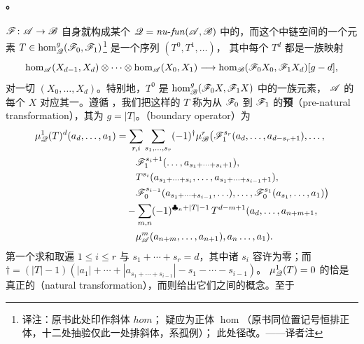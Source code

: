 \paragraph{\trNaturalTransformation。}\label{sub:natural-transformations}
\trNonunital{} \trAFunctor{} $\mathscr{F}\colon\mathscr{A}\to\mathscr{B}$ 自身就构成某个\trNonunital{}
\trACategory{} $\mathscr{Q}=\mathit{nu}\text{-}\mathit{fun}(\mathscr{A},\mathscr{B})$
中的\trObject{}，而这个\trCategory{}中\trMorphism{}链空间的一个元素
$T\in\hom^{g}_{\mathscr{Q}}(\mathscr{F}_0,\mathscr{F}_1)$\footnote{译注：原书此处印作斜体 $hom$；
疑应为正体 $\hom$（原书同位置记号恒排正体，十二处抽验仅此一处排斜体，系孤例）；
此处径改。——译者注} 是一个序列 $(T^0,T^1,\ldots)$，
其中每个 $T^d$ 都是一族\trMultilinear{}映射
\begin{equation*}
\hom_{\mathscr{A}}(X_{d-1},X_d)\otimes\cdots\otimes\hom_{\mathscr{A}}(X_0,X_1)
  \longrightarrow\hom_{\mathscr{B}}(\mathscr{F}_0X_0,\mathscr{F}_1X_d)[g-d],
\end{equation*}
对一切 $(X_0,\ldots,X_d)$。特别地，$T^0$ 是
$\hom^{g}_{\mathscr{B}}(\mathscr{F}_0X,\mathscr{F}_1X)$ 中的一族元素，
$\mathscr{A}$ 的每个\trObject{} $X$ 对应其一。遵循 \trFukaya，我们把这样的 $T$ 称为从
$\mathscr{F}_0$ 到 $\mathscr{F}_1$ 的\textbf{预\trNaturalTransformation}（pre-natural
transformation），其\trDegree{}为 $g=|T|$。\textbf{\trBoundaryOperator}（boundary
operator）为
\begin{equation}\label{eq:natural-transformation-boundary}
\begin{split}
\mu^1_{\mathscr{Q}}(T)^d(a_d,\ldots,a_1)
&=\sum_{r,i}\sum_{s_1,\ldots,s_r}(-1)^{\dagger}\mu^r_{\mathscr{B}}\bigl(
  \mathscr{F}_1^{s_r}(a_d,\ldots,a_{d-s_r+1}),\ldots,\\
&\qquad \mathscr{F}_1^{s_i+1}(\ldots,a_{s_1+\cdots+s_i+1}),\\
&\qquad T^{s_i}(a_{s_1+\cdots+s_i},\ldots,a_{s_1+\cdots+s_{i-1}+1}),\\
&\qquad \mathscr{F}_0^{s_{i-1}}(a_{s_1+\cdots+s_{i-1}},\ldots),\ldots,
  \mathscr{F}_0^{s_1}(a_{s_1},\ldots,a_1)\bigr)\\
&\quad-\sum_{m,n}(-1)^{\clubsuit_n+|T|-1}\,T^{d-m+1}(a_d,\ldots,a_{n+m+1},\\
&\qquad \mu^m_{\mathscr{A}}(a_{n+m},\ldots,a_{n+1}),a_n\ldots,a_1).
\end{split}
\end{equation}
第一个求和取遍 $1\le i\le r$ 与\trPartition{} $s_1+\cdots+s_r=d$，其中诸 $s_i$ 容许为零；而
$\dagger=(|T|-1)(|a_1|+\cdots+|a_{s_1+\cdots+s_{i-1}}|-s_1-\cdots-s_{i-1})$。
$\mu^1_{\mathscr{Q}}(T)=0$ 的\trCocycle{}恰是真正的\textbf{\trNaturalTransformation}（natural
transformation），而\trCoboundary{}则给出它们之间\trChainHomotopy{}的概念。至于
